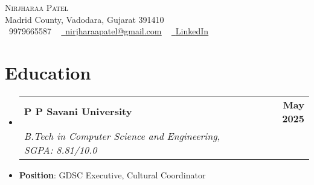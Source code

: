 \documentclass[letterpaper,11pt]{article}
\makeatletter
\newcommand{\resumeSubheading}[4]{
  \vspace{-2pt}\item
    \begin{tabular*}{1.0\textwidth}[t]{l@{\extracolsep{\fill}}r}
      \textbf{#1} & \textbf{\small #2} \\
      \textit{\small#3} & \textit{\small #4} \\
    \end{tabular*}\vspace{-7pt}
}
\newcommand{\resumeSubHeadingListStart}{\begin{itemize}[leftmargin=0.0in, label={}]}
\newcommand{\resumeSubHeadingListEnd}{\end{itemize}}
\makeatother
\begin{document}

\begin{center}
    {\Huge \scshape Nirjharaa Patel} \\ \vspace{1pt}
    Madrid County, Vadodara, Gujarat 391410\\ \vspace{1pt}
    \small \raisebox{-0.1\height}\faPhone\ 9979665587 ~ \href{mailto:nirjharaapatel@gmail@gmail.com}{\raisebox{-0.2\height}\faEnvelope\  \underline{nirjharaapatel@gmail.com}} ~ 
    \href{https://www.linkedin.com/in/nirjharaa-patel-b31314221}{\raisebox{-0.2\height}\faLinkedin\ \underline{LinkedIn}}  ~
    
    \vspace{-15pt}
\end{center}


\section{Education}
  \resumeSubHeadingListStart
    \resumeSubheading
      {P P Savani University}{May 2025}
      {B.Tech in Computer Science and Engineering, SGPA: 8.81/10.0 }{
      
   }
       \item {\textbf{Position}: GDSC Executive, Cultural Coordinator}   
    \resumeSubHeadingListEnd
    \vspace{-20pt}

\end{document}

